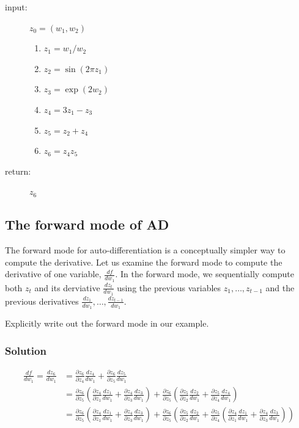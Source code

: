 \documentclass[letterpaper,11pt]{article}
\begin{document}
\begin{description}
\item[input:] $z_0 = \left(w_1,w_2\right)$
  \begin{enumerate}
  \item $z_1 = w_1/w_2$
  \item $z_2 = \sin\left(2\pi z_1\right)$
  \item $z_3 = \exp\left(2w_2\right)$
  \item $z_4 = 3z_1 - z_3$
  \item $z_5 = z_2 + z_4$
  \item $z_6 = z_4z_5$
  \end{enumerate}
\item[return:] $z_6$
\end{description}

\subsection*{The forward mode of AD}

The forward mode for auto-differentiation is a conceptually simpler
way to compute the derivative. Let us examine the forward mode to
compute the derivative of one variable, $\frac{df}{dw_1}$. In the
forward mode, we sequentially compute both $z_t$ and its derviative
$\frac{dz_t}{dw_1}$ using the previous variables $z_1,\ldots,z_{t-1}$
and the previous derivatives
$\frac{dz_1}{dw_1},\ldots,\frac{dz_{t-1}}{dw_1}$.

Explicitly write out the forward mode in our example.

\subsubsection*{Solution}

\begin{align*}
  \frac{df}{dw_1} = \frac{dz_6}{dw_1}
  &= \frac{\partial z_6}{\partial z_4}\frac{dz_4}{dw_1} +
    \frac{\partial z_6}{\partial z_5}\frac{dz_5}{dw_1} \\
  &= \frac{\partial z_6}{\partial z_5}\left(
    \frac{\partial{z_4}}{\partial{z_1}}\frac{dz_1}{dw_1} +
    \frac{\partial{z_4}}{\partial{z_3}}\frac{dz_3}{dw_1}
    \right) +
    \frac{\partial z_6}{\partial z_5}\left(
    \frac{\partial{z_5}}{\partial{z_2}}\frac{dz_2}{dw_1} +
    \frac{\partial{z_5}}{\partial{z_4}}\frac{dz_4}{dw_1}
    \right) \\
  &= \frac{\partial z_6}{\partial z_5}\left(
    \frac{\partial{z_4}}{\partial{z_1}}\frac{dz_1}{dw_1} +
    \frac{\partial{z_4}}{\partial{z_3}}\frac{dz_3}{dw_1}
    \right) +
    \frac{\partial z_6}{\partial z_5}\left(
    \frac{\partial{z_5}}{\partial{z_2}}\frac{dz_2}{dw_1} +
    \frac{\partial{z_5}}{\partial{z_4}}\left(
    \frac{\partial{z_4}}{\partial{z_1}}\frac{dz_1}{dw_1} +
    \frac{\partial{z_4}}{\partial{z_3}}\frac{dz_3}{dw_1}
    \right)
    \right)
\end{align*}
\end{document}
